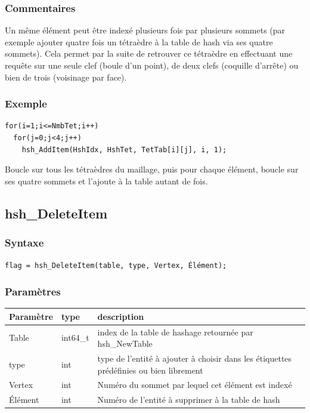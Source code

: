 \documentclass[a4paper,12pt]{article}
\begin{document}
\subsubsection*{Commentaires}
Un même élément peut être indexé plusieurs fois par plusieurs sommets (par exemple ajouter quatre fois un tétraèdre à la table de hash via ses quatre sommets).
Cela permet par la suite de retrouver ce tétraèdre en effectuant une requête sur une seule clef (boule d'un point), de deux clefs (coquille d'arrête) ou bien de trois (voisinage par face).

\subsubsection*{Exemple}

\begin{tt}
\begin{verbatim}
for(i=1;i<=NmbTet;i++)
  for(j=0;j<4;j++)
    hsh_AddItem(HshIdx, HshTet, TetTab[i][j], i, 1);
\end{verbatim}
\end{tt}
\normalfont

Boucle sur tous les tétraèdres du maillage, puis pour chaque élément, boucle sur ses quatre sommets et l'ajoute à la table autant de fois.


\subsection{hsh\_DeleteItem}

\subsubsection*{Syntaxe}
{\tt flag = hsh\_DeleteItem(table, type, Vertex, Élément);}

\subsubsection*{Paramètres}
\begin{tabular}{|m{3cm}|m{2cm}|m{8.5cm}|}
\hline
Paramètre  & type     & description \\
\hline
Table      & int64\_t  & index de la table de hashage retournée par hsh\_NewTable \\
\hline
type       & int      & type de l'entité à ajouter à choisir dans les étiquettes prédéfinies ou bien librement \\
\hline
Vertex     & int      & Numéro du sommet par lequel cet élément est indexé \\
\hline
Élément    & int      & Numéro de l'entité à supprimer à la table de hash \\
\hline
\end{tabular}
\end{document}
